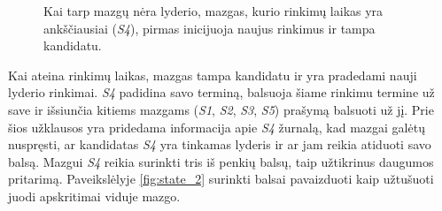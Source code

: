\documentclass{VUMIFPSkursinis}
\begin{document}
\begin{figure}[H]
\centering

    \hfill
    \caption{Kai tarp mazgų nėra lyderio, mazgas, kurio rinkimų laikas yra ankščiausiai (\textit{S4}), pirmas inicijuoja naujus rinkimus ir tampa kandidatu.}
\end{figure}

Kai ateina rinkimų laikas, mazgas tampa kandidatu ir yra pradedami nauji lyderio rinkimai. \textit{S4} padidina savo terminą, balsuoja šiame rinkimu termine už save ir išsiunčia kitiems mazgams (\textit{S1}, \textit{S2}, \textit{S3}, \textit{S5}) prašymą balsuoti už jį. Prie šios užklausos yra pridedama informacija apie \textit{S4} žurnalą, kad mazgai galėtų nuspręsti, ar kandidatas \textit{S4} yra tinkamas lyderis ir ar jam reikia atiduoti savo balsą. Mazgui \textit{S4} reikia surinkti tris iš penkių balsų, taip užtikrinus daugumos pritarimą. Paveikslėlyje \ref{fig:state_2} surinkti balsai pavaizduoti kaip užtušuoti juodi apskritimai viduje mazgo.
\end{document}
